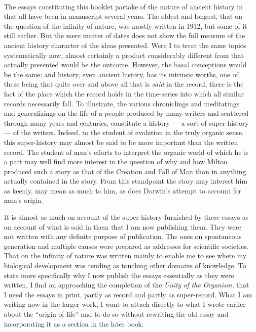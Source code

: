 \documentclass[a4paper, 11pt, oneside, polutonikogreek, english]{article}
\begin{document}
\paragraph{}
The essays constituting this booklet partake of the nature of ancient history in that all have been in manuscript several years. The oldest and longest, that on the question of the infinity of nature, was mostly written in 1912, but some of it still earlier. But the mere matter of dates does not show the full measure of the ancient history character of the ideas presented. Were I to treat the same topics systematically now, almost certainly a product considerably different from that actually presented would be the outcome. However, the basal conceptions would be the same; and history, even ancient history, has its intrinsic worths, one of these being that quite over and above all that is \emph{said} in the record, there is the fact of the place which the record holds in the time-series into which all similar records necessarily fall. To illustrate, the various chroniclings and meditatings and generalizings on the life of a people produced by many writers and scattered through many years and centuries, constitute a history --- a sort of super-history --- of the writers. Indeed, to the student of evolution in the truly organic sense, this super-history may almost be said to be more important than the written record. The student of man's efforts to interpret the organic world of which he is a part may well find more interest in the question of why and how Milton produced such a story as that of the Creation and Fall of Man than in anything actually contained in the story. From this standpoint the story may interest him as keenly, may mean as much to him, as does Darwin's attempt to account for man's origin.

It is almost as much on account of the super-history furnished by these essays as on account of what is said in them that I am now publishing them. They were not written with any definite purpose of publication. The ones on spontaneous generation and multiple causes were prepared as addresses for scientific societies. That on the infinity of nature was written mainly to enable me to see where my biological development was tending as touching other domains of knowledge. To state more specifically why I now publish the essays essentially as they were written, I find on approaching the completion of the \emph{Unity of the Organism}, that I need the essays in print, partly as record and partly as super-record. What I am writing now in the larger work, I want to attach directly to what I wrote earlier about the ``origin of life'' and to do so without rewriting the old essay and incorporating it as a section in the later book.
\end{document}
